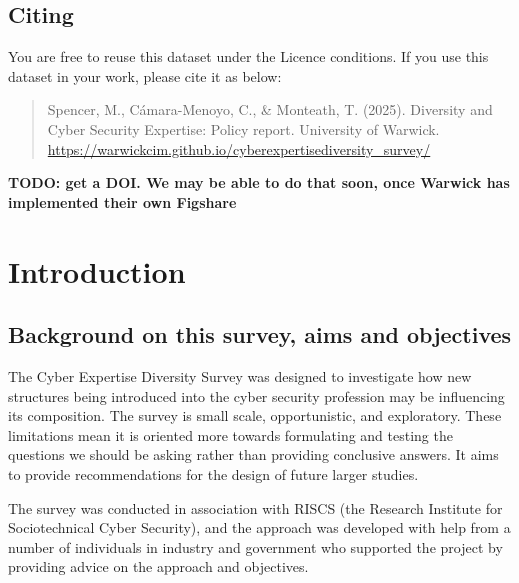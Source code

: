 \documentclass[
  a4paper,
]{book}
\begin{document}
\section*{Citing}\label{citing}


You are free to reuse this dataset under the Licence conditions. If you
use this dataset in your work, please cite it as below:

\begin{quote}
Spencer, M., Cámara-Menoyo, C., \& Monteath, T. (2025). Diversity and
Cyber Security Expertise: Policy report. University of Warwick.
\url{https://warwickcim.github.io/cyberexpertisediversity_survey/}
\end{quote}

\textbf{TODO: get a DOI. We may be able to do that soon, once Warwick
has implemented their own Figshare}


\chapter{Introduction}\label{introduction}

\section{Background on this survey, aims and
objectives}\label{background-on-this-survey-aims-and-objectives}

The Cyber Expertise Diversity Survey was designed to investigate how new
structures being introduced into the cyber security profession may be
influencing its composition. The survey is small scale, opportunistic,
and exploratory. These limitations mean it is oriented more towards
formulating and testing the questions we should be asking rather than
providing conclusive answers. It aims to provide recommendations for the
design of future larger studies.

The survey was conducted in association with RISCS (the Research
Institute for Sociotechnical Cyber Security), and the approach was
developed with help from a number of individuals in industry and
government who supported the project by providing advice on the approach
and objectives.
\end{document}
